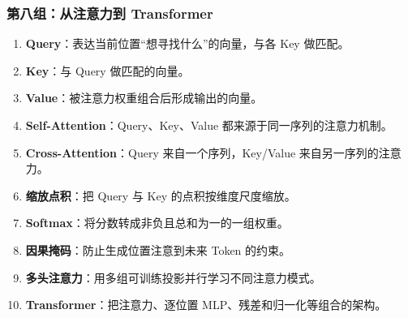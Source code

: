 \subsubsection{第八组：从注意力到 Transformer}
\begin{enumerate}[leftmargin=2.5em,itemsep=4pt,start=71]
\item \textbf{Query}：表达当前位置“想寻找什么”的向量，与各 Key 做匹配。 
\item \textbf{Key}：与 Query 做匹配的向量。 
\item \textbf{Value}：被注意力权重组合后形成输出的向量。 
\item \textbf{Self-Attention}：Query、Key、Value 都来源于同一序列的注意力机制。 
\item \textbf{Cross-Attention}：Query 来自一个序列，Key/Value 来自另一序列的注意力。 
\item \textbf{缩放点积}：把 Query 与 Key 的点积按维度尺度缩放。 
\item \textbf{Softmax}：将分数转成非负且总和为一的一组权重。 
\item \textbf{因果掩码}：防止生成位置注意到未来 Token 的约束。 
\item \textbf{多头注意力}：用多组可训练投影并行学习不同注意力模式。 
\item \textbf{Transformer}：把注意力、逐位置 MLP、残差和归一化等组合的架构。 
\end{enumerate}

